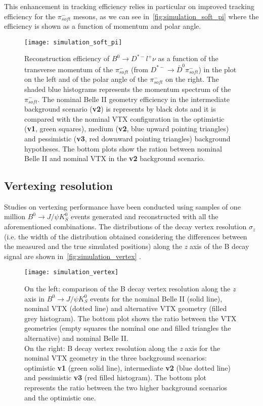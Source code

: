 This enhancement in tracking efficiency relies in particular on improved tracking efficiency for the $\pi_{soft}^{-}$ mesons, as we can see in~\autoref{fig:simulation_soft_pi} where the efficiency is shown as a function of momentum and polar angle.


\begin{figure}[h!]
\centering
\texttt{[image: simulation\_soft\_pi]}
\caption{Reconstruction efficiency of $B^{0} \rightarrow D^{*-}l^{+}\nu$ as a function of the transverse momentum of the $\pi_{soft}^{-}$ (from  $D^{*-} \rightarrow \bar{D}^{0} \pi^{-}_{soft}$) in the plot on the left and of the polar angle of the $\pi_{soft}^{-}$ on the right. 
The shaded blue histograms represents the momentum spectrum of the  $\pi_{soft}^{-}$.
The nominal Belle II geometry efficiency in the intermediate background scenario (\textbf{v2}) is represents by black dots and it is compared with the nominal VTX configuration in the optimistic (\textbf{v1}, green squares), medium (\textbf{v2}, blue upward pointing triangles) and pessimistic (\textbf{v3}, red downward
pointing triangles) background hypotheses. The bottom plots show the ration between nominal Belle II and nominal VTX in the \textbf{v2} background scenario.}
\label{fig:simulation_soft_pi}
\end{figure}


\subsection{Vertexing resolution}

Studies on vertexing performance have been conducted using samples of one million $B^{0} \rightarrow J/\psi K_{S}^{0}$ events generated and reconstructed with all the aforementioned combinations.
The distributions of the decay vertex resolution $\sigma_{z}$ (i.e. the width of the distribution obtained considering the differences between the measured and the true simulated positions) along the \textit{z} axis of the B decay signal are shown in~\autoref{fig:simulation_vertex} .

\begin{figure}[h!]
\centering
\texttt{[image: simulation\_vertex]}
\caption{On the left: comparison of the B decay vertex resolution along the \textit{z} axis in $B^{0} \rightarrow J/\psi K_{S}^{0}$ events for the nominal Belle II (solid line), nominal VTX (dotted line) and alternative VTX geometry (filled grey histogram). The bottom plot shows the ratio between the VTX geometries (empty squares the nominal one and filled triangles the alternative) and nominal Belle II. \\
On the right:  B decay vertex resolution along the \textit{z} axis for the nominal VTX geometry in the three background scenarios: optimistic \textbf{v1} (green solid line), intermediate \textbf{v2} (blue dotted line) and pessimistic \textbf{v3} (red filled histogram). The bottom plot represents the ratio between the two higher background scenarios and the optimistic one.}
\label{fig:simulation_vertex}
\end{figure}

